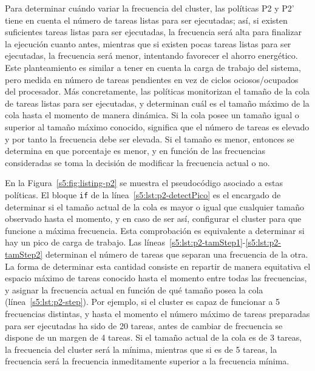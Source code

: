 Para determinar cuándo variar la frecuencia del cluster, las políticas P2 y P2' tiene en cuenta
el número de tareas listas para ser ejecutadas; así, si existen suficientes
tareas listas para ser ejecutadas, la frecuencia será alta para 
finalizar la ejecución cuanto antes, mientras que si existen pocas tareas
listas para ser ejecutadas, la frecuencia será menor, intentando favorecer
el ahorro energético. Este planteamiento es similar a tener en cuenta la
carga de trabajo del sistema, pero medida en número de tareas pendientes en
vez de ciclos ociosos/ocupados del procesador. Más concretamente, las
políticas monitorizan el tamaño de la cola de tareas listas para ser
ejecutadas, y determinan cuál es el tamaño máximo de la cola hasta el
momento de manera dinámica. Si la cola posee un tamaño igual o superior al
tamaño máximo conocido, significa que el número de tareas es elevado y por
tanto la frecuencia debe ser elevada. Si el tamaño es menor, entonces se
determina en que porcentaje es menor, y en función de las frecuencias
consideradas se toma la decisión de modificar la frecuencia actual o no. 

En la Figura~\ref{s5:fig:listing-p2} se muestra el pseudocódigo
asociado a estas políticas. El bloque \texttt{if} de la
línea~\ref{s5:lst:p2-detectPico} es el encargado de determinar si el tamaño
actual de la cola es mayor o igual que cualquier tamaño observado hasta el momento, y
en caso de ser así, configurar el cluster para que funcione a máxima
frecuencia. Esta comprobación es equivalente a determinar si hay un pico de carga de
trabajo. Las líneas~\ref{s5:lst:p2-tamStep1}-\ref{s5:lst:p2-tamStep2}
determinan el número de tareas que separan una frecuencia de la otra. La
forma de determinar esta cantidad consiste en repartir de manera equitativa
el espacio máximo de tareas conocido hasta el momento entre todas las
frecuencias, y asignar la frecuencia actual en función de qué tamaño posea
la cola (línea~\ref{s5:lst:p2-step}). Por ejemplo, si el cluster es capaz
de funcionar a 5 frecuencias distintas, y hasta el momento el número
máximo de tareas preparadas para ser ejecutadas ha sido de 20 tareas, antes
de cambiar de frecuencia se dispone de un margen de 4 tareas. Si el tamaño
actual de la cola es de 3 tareas, la frecuencia del cluster será la mínima,
mientras que si es de 5 tareas, la frecuencia será la frecuencia
inmeditamente superior a la frecuencia mínima.

